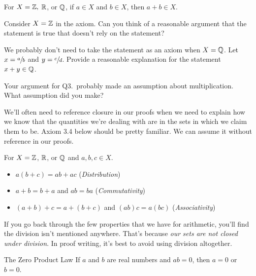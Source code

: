 \begin{axiom} For $X = \mathbb{Z},$ $\mathbb{R}$, or $\mathbb{Q}$, if $a \in X$ and $b \in X$, then $a+b \in X$.  
\end{axiom}
		\begin{question}[resume]
		\item Consider $X = \mathbb{Z}$ in the axiom.  Can you think of a reasonable argument that the statement is true that doesn't rely on the statement?
		\vspace{1in}
		\item We probably don't need to take the statement as an axiom when $X=\mathbb{Q}$.  Let $x=\sfrac{a}{b}$ and $y=\sfrac{c}{d}$.  Provide a reasonable explanation for the statement $x+y \in \mathbb{Q}$.
		\vspace{1.5in}
		
		\item Your argument for Q3.~probably made an assumption about multiplication.  What assumption did you make?
		\vspace{.5in}
		\end{question}

\noindent We'll often need to reference closure in our proofs when we need to explain how we know that the quantities we're dealing with are in the sets in which we claim them to be.  Axiom 3.4 below should be pretty familiar.  We can assume it without reference in our proofs.

\begin{axiom}  For $X = \mathbb{Z}$, $\mathbb{R}$, or $\mathbb{Q}$ and $a,b,c \in X$.
		\begin{itemize}
		\item $a(b+c) = ab+ac$  (\textit{Distribution}) 
		\item $a+b=b+a$ and $ab=ba$  (\textit{Commutativity})
		\item $(a+b)+c=a+(b+c)$ and $(ab)c=a(bc)$  (\textit{Associativity})
		\end{itemize}
\end{axiom}

\begin{remark}  If you go back through the few properties that we have for arithmetic, you'll find the division isn't mentioned anywhere.  That's because \textit{our sets are not closed under division}.  In proof writing, it's best to avoid using division altogether.   
\end{remark}

\begin{axiom}{The Zero Product Law}  If $a$ and $b$ are real numbers and $ab=0$, then $a=0$ or $b=0$.
\end{axiom}

